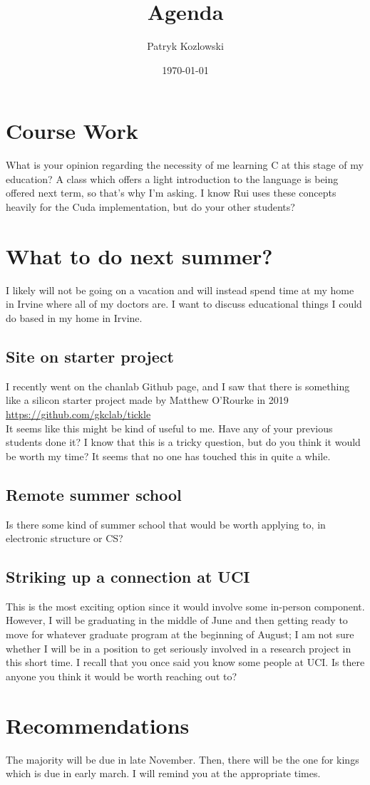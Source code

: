 \documentclass[12pt]{article}
\title{Agenda}
\author{Patryk Kozlowski}
\date{\today}
\begin{document}
\maketitle
\section{Course Work}
What is your opinion regarding the necessity of me learning C at this stage of my education? A class which offers a light introduction to the language is being offered next term, so that's why I'm asking. I know Rui uses these concepts heavily for the Cuda implementation, but do your other students?
\section{What to do next summer?}
I likely will not be going on a vacation and will instead spend time at my home in Irvine where all of my doctors are. I want to discuss educational things I could do based in my home in Irvine.
\subsection{Site on starter project}
I recently went on the chanlab Github page, and I saw that there is something like a silicon starter project made by Matthew O'Rourke in 2019\\ \url{https://github.com/gkclab/tickle}\\
It seems like this might be kind of useful to me. Have any of your previous students done it? I know that this is a tricky question, but do you think it would be worth my time? It seems that no one has touched this in quite a while.
\subsection{Remote summer school}
Is there some kind of summer school that would be worth applying to, in electronic structure or CS?
\subsection{Striking up a connection at UCI}
This is the most exciting option since it would involve some in-person component. However, I will be graduating in the middle of June and then getting ready to move for whatever graduate program at the beginning of August; I am not sure whether I will be in a position to get seriously involved in a research project in this short time. I recall that you once said you know some people at UCI. Is there anyone you think it would be worth reaching out to?
\section{Recommendations}
The majority will be due in late November. Then, there will be the one for kings which is due in early march. I will remind you at the appropriate times.
\end{document}

